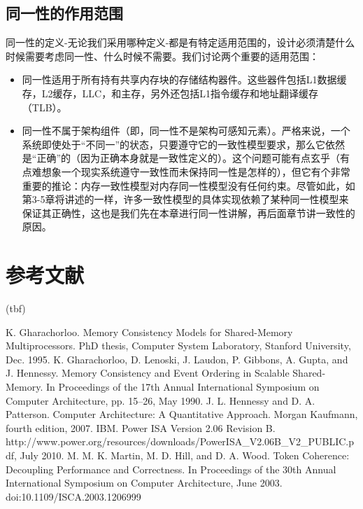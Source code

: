\documentclass[UTF-8]{ctexrep}
\begin{document}
\subsection{同一性的作用范围}
同一性的定义-无论我们采用哪种定义-都是有特定适用范围的，设计必须清楚什么时候需要考虑同一性、什么时候不需要。我们讨论两个重要的适用范围：
\begin{itemize}
\item 同一性适用于所有持有共享内存块的存储结构器件。这些器件包括L1数据缓存，L2缓存，LLC，和主存，另外还包括L1指令缓存和地址翻译缓存（TLB）。
\item 同一性不属于架构组件（即，同一性不是架构可感知元素）。严格来说，一个系统即使处于“不同一”的状态，只要遵守它的一致性模型要求，那么它依然是“正确”的（因为正确本身就是一致性定义的）。这个问题可能有点玄乎（有点难想象一个现实系统遵守一致性而未保持同一性是怎样的），但它有个非常重要的推论：内存一致性模型对内存同一性模型没有任何约束。尽管如此，如第3-5章将讲述的一样，许多一致性模型的具体实现依赖了某种同一性模型来保证其正确性，这也是我们先在本章进行同一性讲解，再后面章节讲一致性的原因。

\end{itemize}
\section{参考文献}
(tbf)
\begin{thebibliography}{99}
K. Gharachorloo. Memory Consistency Models for Shared-Memory Multiprocessors. PhD thesis, Computer System Laboratory, Stanford University, Dec. 1995.
K. Gharachorloo, D. Lenoski, J. Laudon, P. Gibbons, A. Gupta, and J. Hennessy. Memory Consistency and Event Ordering in Scalable Shared-Memory. In Proceedings of the 17th
Annual International Symposium on Computer Architecture, pp. 15–26, May 1990.
J. L. Hennessy and D. A. Patterson. Computer Architecture: A Quantitative Approach. Morgan Kaufmann, fourth edition, 2007.
IBM. Power ISA Version 2.06 Revision B. http://www.power.org/resources/downloads/PowerISA\_V2.06B\_V2\_PUBLIC.pdf, July 2010.
M. M. K. Martin, M. D. Hill, and D. A. Wood. Token Coherence: Decoupling Performance and Correctness. In Proceedings of the 30th Annual International Symposium on Computer Architecture, June 2003. doi:10.1109/ISCA.2003.1206999
\end{thebibliography}
\end{document}
